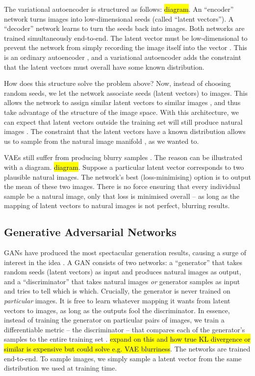 \documentclass[10pt,a4paper]{article}
\newcommand{\nquote}[1]{``{#1}''}
\begin{document}
The variational autoencoder \cite{??} is structured as follows: \hl{diagram}. An \nquote{encoder} network turns images into low-dimensional seeds (called \nquote{latent vectors}). A \nquote{decoder} network learns to turn the seeds back into images. Both networks are trained simultaneously end-to-end. The latent vector must be low-dimensional to prevent the network from simply recording the image itself into the vector \cite{??}. This is an ordinary autoencoder \cite{??}, and a variational autoencoder \cite{??} adds the constraint that the latent vectors must overall have some known distribution.

How does this structure solve the problem above? Now, instead of choosing random seeds, we let the network associate seeds (latent vectors) to images. This allows the network to assign similar latent vectors to similar images \cite{??}, and thus take advantage of the structure of the image space. With this architecture, we can expect that latent vectors outside the training set will still produce natural images \cite{??}. The constraint that the latent vectors have a known distribution allows us to sample from the natural image manifold \cite{??}, as we wanted to.

VAEs still suffer from producing blurry samples \cite{??}. The reason can be illustrated with a diagram. \hl{diagram}. Suppose a particular latent vector corresponds to two plausible natural images. The network's best (loss-minimising) option is to output the mean of these two images. There is no force ensuring that every individual sample be a natural image, only that loss is minimised overall -- as long as the mapping of latent vectors to natural images is not perfect, blurring results.

\subsection{Generative Adversarial Networks}

GANs have produced the most spectacular generation results, causing a surge of interest in the idea \cite{??}\cite{??}\cite{??}. A GAN consists of two networks: a \nquote{generator} that takes random seeds (latent vectors) as input and produces natural images as output, and a \nquote{discriminator} that takes natural images \emph{or} generator samples as input and tries to tell which is which. Crucially, the generator is never trained on \emph{particular} images. It is free to learn whatever mapping it wants from latent vectors to images, as long as the outputs fool the discriminator. In essence, instead of training the generator on particular pairs of images, we train a differentiable metric -- the discriminator -- that compares each of the generator's samples to the entire training set \cite{??}. \hl{expand on this and how true KL divergence or similar is expensive but could solve e.g. VAE blurriness}. The networks are trained end-to-end. To sample images, we simply sample a latent vector from the same distribution we used at training time.
\end{document}
